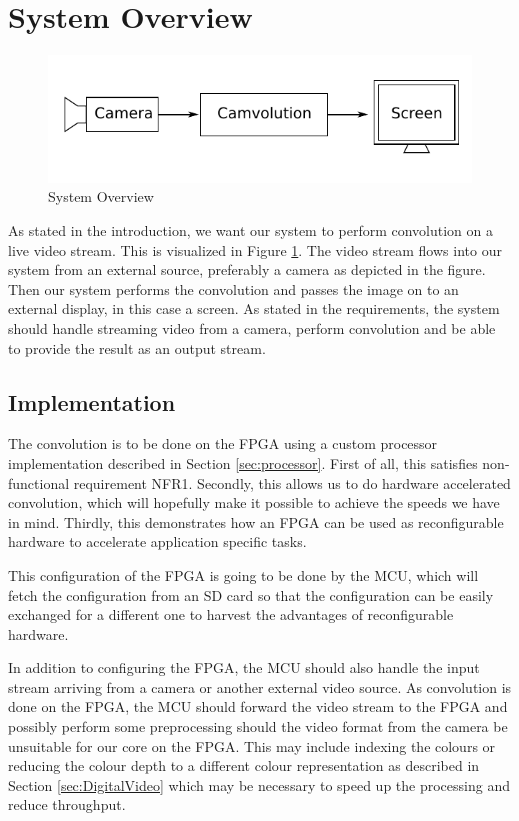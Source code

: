 \section{System Overview}


\begin{figure}[h]
    \centering
    \includegraphics{img/SystemOverview.pdf}
    \caption{System Overview}
    \label{fig:SystemOverview}
\end{figure}

As stated in the introduction, we want our system to perform convolution on a live video stream.
This is visualized in Figure \ref{fig:SystemOverview}.
The video stream flows into our system from an external source, preferably a camera as depicted in the figure.
Then our system performs the convolution and passes the image on to an external display, in this case a screen.
As stated in the requirements, the system should handle streaming video from a camera, perform convolution and be able to provide the result as an output stream.

\subsection{Implementation}
The convolution is to be done on the FPGA using a custom processor implementation described in Section \ref{sec:processor}.
First of all, this satisfies non-functional requirement NFR1.
Secondly, this allows us to do hardware accelerated convolution, which will hopefully make it possible to achieve the speeds we have in mind.
Thirdly, this demonstrates how an FPGA can be used as reconfigurable hardware to accelerate application specific tasks.

This configuration of the FPGA is going to be done by the MCU, which will fetch the configuration from an SD card so that the configuration can be easily exchanged for a different one to harvest the advantages of reconfigurable hardware.

In addition to configuring the FPGA, the MCU should also handle the input stream arriving from a camera or another external video source.
As convolution is done on the FPGA, the MCU should forward the video stream to the FPGA and possibly perform some preprocessing should the video format from the camera be unsuitable for our core on the FPGA.
This may include indexing the colours or reducing the colour depth to a different colour representation as described in Section \ref{sec:DigitalVideo} which may be necessary to speed up the processing and reduce throughput.

